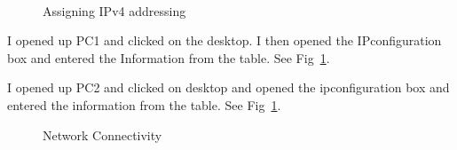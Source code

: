 \documentclass[../EngineeringJournal_CDavis.tex]{subfiles}
\begin{document}

\\

\begin{figure}\centering
{}\hfill
{}\par 
\caption{Assigning IPv4 addressing}\label{Assign3}
\end{figure}


\noindent I opened up PC1 and clicked on the desktop. I then opened the
IPconfiguration box and entered the Information from the table. See
Fig~\ref{Assign3}.
\hfill\break

\noindent I opened up PC2 and clicked on desktop and opened the ipconfiguration box and entered
the information from the table. See Fig~\ref{Assign3}.
\hfill\break

\begin{figure}[!b]\centering
{}\hfill
{}\par 
\caption{Network Connectivity}\label{connect3V4}
\end{figure}
\end{document}
